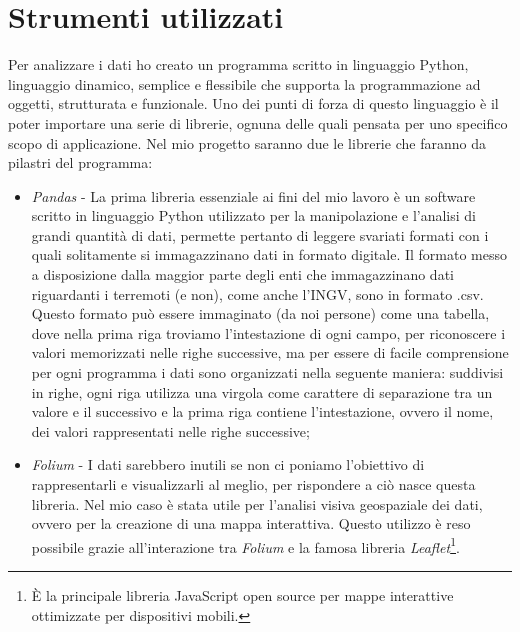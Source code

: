 \section{Strumenti utilizzati}\label{analisiDati}

Per analizzare i dati ho creato un programma scritto in linguaggio Python, linguaggio dinamico, semplice e flessibile che supporta la programmazione ad oggetti, strutturata e funzionale. Uno dei punti di forza di questo linguaggio \`e il poter importare una serie di librerie, ognuna delle quali pensata per uno specifico scopo di applicazione. Nel mio progetto saranno due le librerie che faranno da pilastri del programma:
\begin{itemize}
    \item \textit{Pandas} - La prima libreria essenziale ai fini del mio lavoro \`e un software scritto in linguaggio Python utilizzato per la manipolazione e l'analisi di grandi quantit\`a di dati, permette pertanto di leggere svariati formati con i quali solitamente si immagazzinano dati in formato digitale. Il formato messo a disposizione dalla maggior parte degli enti che immagazzinano dati riguardanti i terremoti (e non), come anche l'INGV, sono in formato .csv. Questo formato pu\`o essere immaginato (da noi persone) come una tabella, dove nella prima riga troviamo l'intestazione di ogni campo, per riconoscere i valori memorizzati nelle righe successive, ma per essere di facile comprensione per ogni programma i dati sono organizzati nella seguente maniera: suddivisi in righe, ogni riga utilizza una virgola come carattere di separazione tra un valore e il successivo e la prima riga contiene l'intestazione, ovvero il nome, dei valori rappresentati nelle righe successive;
    \item \textit{Folium} - I dati sarebbero inutili se non ci poniamo l'obiettivo di rappresentarli e visualizzarli al meglio, per rispondere a ci\`o nasce questa libreria. Nel mio caso \`e stata utile per l'analisi visiva geospaziale dei dati, ovvero per la creazione di una mappa interattiva. Questo utilizzo \`e reso possibile grazie all'interazione tra \textit{Folium} e la famosa libreria \textit{Leaflet}\footnote{\`E la principale libreria JavaScript open source per mappe interattive ottimizzate per dispositivi mobili.}.
\end{itemize}